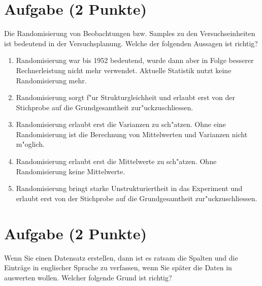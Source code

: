 \documentclass[a4paper, 9pt]{scrartcl}\usepackage[]{graphicx}\usepackage[]{xcolor}
\begin{document}
\section{Aufgabe \hfill (2 Punkte)}

Die Randomisierung von Beobachtungen bzw. Samples zu den Versuchseinheiten
ist bedeutend in der Versuchsplanung. Welche der folgenden Aussagen ist richtig?



\begin{enumerate}
\item [\textbf{A} \msquare] Randomisierung war bis 1952 bedeutend, wurde dann aber in Folge besserer Rechnerleistung nicht mehr verwendet. Aktuelle Statistik nutzt keine Randomisierung mehr.
\item [\textbf{B} \msquare] Randomisierung sorgt f{"u}r Strukturgleichheit und erlaubt erst von der Stichprobe auf die Grundgesamtheit zur{"u}ckzuschliessen.
\item [\textbf{C} \msquare] Randomisierung erlaubt erst die Varianzen zu sch{"a}tzen. Ohne eine Randomisierung ist die Berechnung von Mittelwerten und Varianzen nicht m{"o}glich.
\item [\textbf{D} \msquare] Randomisierung erlaubt erst die Mittelwerte zu sch{"a}tzen. Ohne Randomisierung keine Mittelwerte.
\item [\textbf{E} \msquare] Randomisierung bringt starke Unstrukturiertheit in das Experiment und erlaubt erst von der Stichprobe auf die Grundgesamtheit zur{"u}ckzuschliessen.
\end{enumerate}

\section{Aufgabe \hfill (2 Punkte)}

Wenn Sie einen Datensatz erstellen, dann ist es ratsam die Spalten und die
Eintr{\"a}ge in englischer Sprache zu verfassen, wenn Sie sp{\"a}ter die Daten in
\Rlogo auswerten wollen. Welcher folgende Grund ist richtig?
\end{document}

